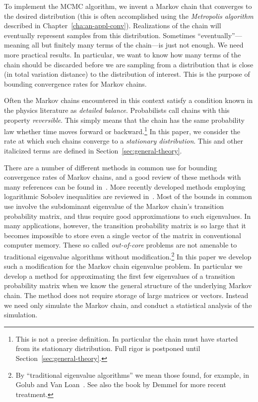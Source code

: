 \documentclass[12pt,letterpaper]{report}
\theoremstyle{plain}
\theoremstyle{definition}
\theoremstyle{remark}
\numberwithin{theorem}{chapter}
\numberwithin{claim}{chapter}
\numberwithin{equation}{chapter}
\numberwithin{conjecture}{chapter}
\newcommand\<{\ensuremath{\langle}}
\renewcommand\>{\ensuremath{\rangle}}
\begin{document}
To implement the MCMC algorithm, we invent a Markov chain that converges to the
desired distribution (this is often accomplished using the \emph{Metropolis algorithm}
described in Chapter~\ref{cha:an-appl-conv}). Realizations of the chain will
eventually represent samples from this distribution. Sometimes
``eventually''---meaning all but finitely many terms of the chain---is just not 
enough. We need more practical results. In particular, we want to know how many
terms of the chain should be discarded before we are sampling from a
distribution that is close (in total variation distance) to 
%
%
%
%
the distribution of interest. This is the purpose of bounding convergence rates
for Markov chains. 

Often the Markov chains encountered in this context satisfy a condition known in
the physics literature as \emph{detailed balance}. Probabilists call chains with
this property \emph{reversible}. This simply means that the chain has the same
probability law whether time moves forward or backward.\footnote{This is not a
precise definition. In particular the chain must have started from its
stationary distribution. Full rigor is postponed until
Section~\ref{sec:general-theory}.} 
In this paper, we consider the rate at which such chains converge to
a \emph{stationary distribution}. This and other italicized terms are
defined in Section~\ref{sec:general-theory}.

There are a number of different methods in common use for bounding convergence
rates of Markov chains, and a good review of these methods with many references
can be found in~\cite{Rosenthal:1995}.  More recently developed methods
employing logarithmic Sobolev inequalities are reviewed in~\cite{Diaconis:1996}.  
Most of the bounds in common use involve the subdominant eigenvalue of the
Markov chain's transition probability matrix, and thus require good
approximations to such eigenvalues. In many applications, however, the
transition probability matrix is so large that it becomes impossible to store
even a single vector of the matrix in conventional computer memory. These so
called \emph{out-of-core} problems are not amenable to traditional eigenvalue
algorithms without modification.\footnote{By ``traditional 
  eigenvalue algorithms'' we mean those found, for example, in Golub and Van
  Loan~\cite{Golub:1996}. See also the book by Demmel\cite{Demmel:1997} for more 
  recent treatment.}
In this paper we develop such a modification for the Markov chain eigenvalue
problem. In particular we develop a method for approximating the first few
eigenvalues of a transition probability matrix when we know the general
structure of the underlying Markov chain. The method does not require storage
of large matrices or vectors. Instead we need only simulate the Markov chain,
and conduct a statistical analysis of the simulation.
\end{document}
